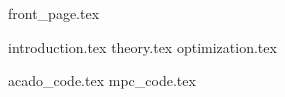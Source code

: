 \documentclass[]{report}
\numberwithin{equation}{chapter}
\begin{document}
{front_page.tex}

\setcounter{page}{1}

\tableofcontents
\newpage

\listoffigures									
{}
\clearpage

\setcounter{page}{1}
\pagestyle{fancy}

{introduction.tex}
{theory.tex}
{optimization.tex}

\begin{appendices}
{acado_code.tex}
{mpc_code.tex}
\end{appendices}


\newpage


{}
\end{document}

